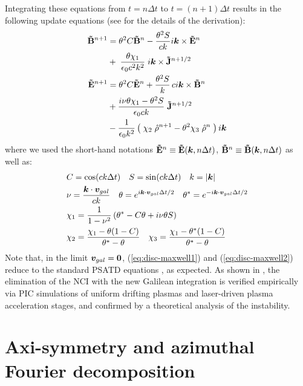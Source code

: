 \documentclass[]{report}
\begin{document}
Integrating these equations from $t=n\Delta
t$ to $t=(n+1)\Delta t$ results in the following update equations (see
\cite{LeheARXIV2016} for the details of the derivation):
%
\begin{subequations}
\begin{align}
\mathbf{\tilde{B}}^{n+1} &= \theta^2 C \mathbf{\tilde{B}}^n
 -\frac{\theta^2 S}{ck}i\boldsymbol{k}\times \mathbf{\tilde{E}}^n \nonumber \\
& + \;\frac{\theta \chi_1}{\epsilon_0c^2k^2}\;i\boldsymbol{k} \times
                     \mathbf{\tilde{J}}^{n+1/2} \label{eq:disc-maxwell1}\\
\mathbf{\tilde{E}}^{n+1} &=  \theta^2 C  \mathbf{\tilde{E}}^n
 +\frac{\theta^2 S}{k} \,c i\boldsymbol{k}\times \mathbf{\tilde{B}}^n \nonumber \\
& +\frac{i\nu \theta \chi_1 - \theta^2S}{\epsilon_0 ck} \; \mathbf{\tilde{J}}^{n+1/2}\nonumber \\
& - \frac{1}{\epsilon_0k^2}\left(\; \chi_2\;\hat{\mathcal{\rho}}^{n+1} -
  \theta^2\chi_3\;\hat{\mathcal{\rho}}^{n} \;\right) i\boldsymbol{k} \label{eq:disc-maxwell2}
\end{align}
\end{subequations}
%
where we used the short-hand notations $\fe^n \equiv
%
\fe(\vec{k}, n\Delta t)$, $\mathbf{\tilde{B}}^n \equiv
\mathbf{\tilde{B}}(\boldsymbol{k}, n\Delta t)$ as well as:
\begin{subequations}
\begin{align}
&C = \cos(ck\Delta t) \quad S = \sin(ck\Delta t) \quad k
= |\boldsymbol{k}| \label{eq:def-C-S}\\&
\nu = \frac{\boldsymbol{k}\cdot\boldsymbol{v}_{gal}}{ck} \quad \theta =
  e^{i\boldsymbol{k}\cdot\boldsymbol{v}_{gal}\Delta t/2} \quad \theta^* =
  e^{-i\boldsymbol{k}\cdot\boldsymbol{v}_{gal}\Delta t/2} \label{eq:def-nu-theta}\\&
\chi_1 =  \frac{1}{1 -\nu^2} \left( \theta^* -  C \theta + i
  \nu \theta S \right) \label{eq:def-chi1}\\&
\chi_2 = \frac{\chi_1 - \theta(1-C)}{\theta^*-\theta} \quad
\chi_3 = \frac{\chi_1-\theta^*(1-C)}{\theta^*-\theta} \label{eq:def-chi23}
\end{align}
\end{subequations}
Note that, in the limit $\boldsymbol{v}_{gal}=\boldsymbol{0}$,
(\ref{eq:disc-maxwell1}) and (\ref{eq:disc-maxwell2}) reduce to the standard PSATD
equations \cite{Habericnsp73}, as expected.
As shown in \cite{KirchenARXIV2016,LeheARXIV2016},
the elimination of the NCI with the new Galilean integration is verified empirically via PIC simulations of uniform drifting plasmas and laser-driven plasma acceleration stages, and confirmed by a theoretical analysis of the instability.

\section{Axi-symmetry and azimuthal Fourier decomposition}
\end{document}
